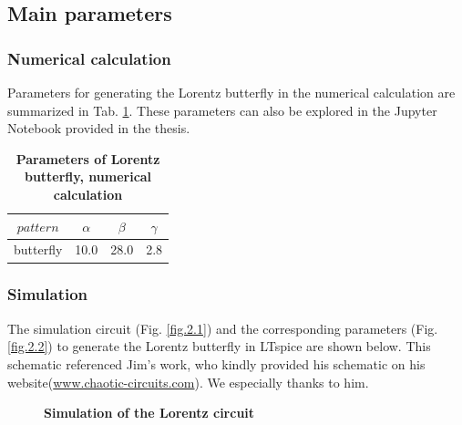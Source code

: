 \documentclass[12pt,a4paper,UTF8]{article}
\begin{document}
    \subsection{Main parameters}
    \subsubsection{Numerical calculation}
    Parameters for generating the Lorentz butterfly in the numerical calculation are summarized in Tab. \ref{tab.2.1}.
    These parameters can also be explored in the Jupyter Notebook provided in the thesis.
        \begin{table}[htbp]
            \centering
            \caption{\textbf{Parameters of Lorentz butterfly, numerical calculation}}
            \label{tab.2.1}
                \begin{tabular}{cccc}
                    \toprule
                    $pattern$	&$\alpha$	&$\beta$    &$\gamma$ \\
                    \midrule
                    butterfly	&10.0	&28.0	&2.8	\\
                    \bottomrule
                \end{tabular}
        \end{table}

    \subsubsection{Simulation}
    The simulation circuit (Fig. \ref{fig.2.1}) and the corresponding parameters (Fig. \ref{fig.2.2}) to generate the Lorentz butterfly in LTspice are shown below.
    This schematic referenced Jim's work, who kindly provided his schematic on his website(\href{http://www.chaotic-circuits.com/10-creating-lorenz-butterfly/}{www.chaotic-circuits.com}).    
    We especially thanks to him.
    \begin{figure}[htbp]
        \centering
        \caption{\textbf{Simulation of the Lorentz circuit}}
    \end{figure}
\end{document}

